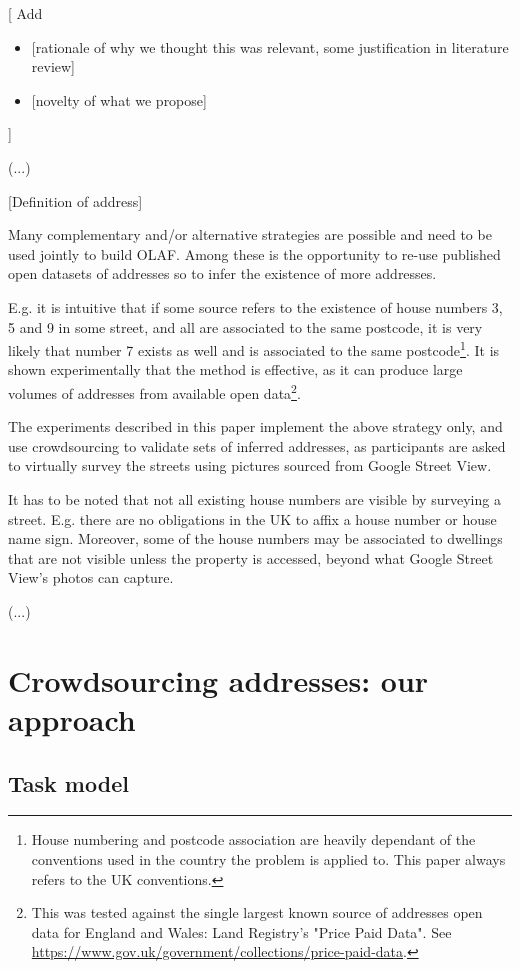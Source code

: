 \documentclass{llncs}
\begin{document}
{[}
Add
\begin{itemize}
	\item {[}rationale of why we thought this was relevant, some justification in literature review{]}
	\item {[}novelty of what we propose{]}
\end{itemize}
{]}

{(}...{)}

{[}Definition of address{]}

Many complementary and/or alternative strategies are possible and need to be used jointly to build OLAF. Among these is the opportunity to re-use published open datasets of addresses so to infer the existence of more addresses. 

E.g. it is intuitive that if some source refers to the existence of house numbers 3, 5 and 9 in some street, and all are associated to the same postcode, it is very likely that number 7 exists as well and is associated to the same postcode\footnote{House numbering and postcode association are heavily dependant of the conventions used in the country the problem is applied to. This paper always refers to the UK conventions.}. It is shown experimentally that the method is effective, as it can produce large volumes of addresses from available open data\footnote{This was tested against the single largest known source of addresses open data for England and Wales: Land Registry's "Price Paid Data". See \url{https://www.gov.uk/government/collections/price-paid-data}.}.

The experiments described in this paper implement the above strategy only, and  use crowdsourcing to validate sets of inferred addresses, as participants are asked to virtually survey the streets using pictures sourced from Google Street View.

It has to be noted that not all existing house numbers are visible by surveying a street. E.g. there are no obligations in the UK to affix a house number or house name sign. Moreover, some of the house numbers may be associated to dwellings that are not visible unless the property is accessed, beyond what Google Street View's photos can capture.

{(}...{)}

\section{Crowdsourcing addresses: our approach}

\subsection{Task model}
\end{document}
